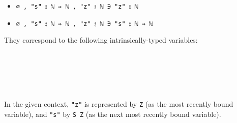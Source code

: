 \begin{itemize}
\tightlist
\item
  \texttt{∅\ ,\ "s"\ ⦂\ \textasciigrave{}ℕ\ ⇒\ \textasciigrave{}ℕ\ ,\ "z"\ ⦂\ \textasciigrave{}ℕ\ ∋\ "z"\ ⦂\ \textasciigrave{}ℕ}
\item
  \texttt{∅\ ,\ "s"\ ⦂\ \textasciigrave{}ℕ\ ⇒\ \textasciigrave{}ℕ\ ,\ "z"\ ⦂\ \textasciigrave{}ℕ\ ∋\ "s"\ ⦂\ \textasciigrave{}ℕ\ ⇒\ \textasciigrave{}ℕ}
\end{itemize}

They correspond to the following intrinsically-typed variables:

\begin{fence}
\begin{code}%
\>[0]\AgdaFunction{\AgdaUnderscore{}}\AgdaSpace{}%
\AgdaSymbol{:}\AgdaSpace{}%
\AgdaSpace{}%
\AgdaOperator{\AgdaInductiveConstructor{,}}\AgdaSpace{}%
\AgdaSpace{}%
\AgdaSpace{}%
\AgdaSpace{}%
\AgdaOperator{\AgdaInductiveConstructor{,}}\AgdaSpace{}%
\AgdaSpace{}%
\AgdaSpace{}%
\<%
\\
\>[0]\AgdaSymbol{\AgdaUnderscore{}}\AgdaSpace{}%
\AgdaSymbol{=}\AgdaSpace{}%
\<%
\\
%
\\[\AgdaEmptyExtraSkip]%
\>[0]\AgdaFunction{\AgdaUnderscore{}}\AgdaSpace{}%
\AgdaSymbol{:}\AgdaSpace{}%
\AgdaSpace{}%
\AgdaOperator{\AgdaInductiveConstructor{,}}\AgdaSpace{}%
\AgdaSpace{}%
\AgdaSpace{}%
\AgdaSpace{}%
\AgdaOperator{\AgdaInductiveConstructor{,}}\AgdaSpace{}%
\AgdaSpace{}%
\AgdaSpace{}%
\AgdaSpace{}%
\AgdaSpace{}%
\<%
\\
\>[0]\AgdaSymbol{\AgdaUnderscore{}}\AgdaSpace{}%
\AgdaSymbol{=}\AgdaSpace{}%
\AgdaSpace{}%
\<%
\end{code}
\end{fence}

In the given context, \texttt{"z"} is represented by \texttt{Z} (as the
most recently bound variable), and \texttt{"s"} by \texttt{S\ Z} (as the
next most recently bound variable).

